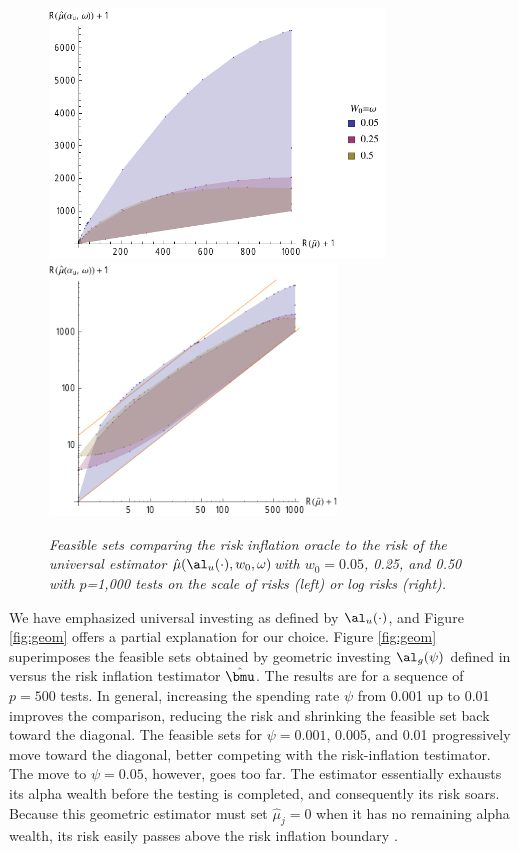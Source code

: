 \documentclass[12pt]{article}
\newcommand{\uTest}{\mbox{$\hat\mu(\al_u(\cdot),w_0,\omega)$}}
\begin{document}
\begin{figure}
 \caption{ \label{fig:univRI} {\sl Feasible sets comparing the risk inflation
 oracle to the risk of the universal estimator \uTest with $w_0=0.05$, 0.25, and
 0.50 with $p$=1,000 tests on the scale of risks (left) or log risks (right).}
  }

 \vspace{0.1in}
 \centerline{
 \includegraphics[width=3.5in]{figures/univVsRI}
 \includegraphics[width=3.0in]{figures/univVsRILog}    }
 \vspace{0.2in}
\end{figure}


 We have emphasized universal investing as defined by $\al_u(\cdot)$, and Figure
 \ref{fig:geom} offers a partial explanation for our choice.  Figure
 \ref{fig:geom} superimposes the feasible sets obtained by geometric investing
 $\al_g(\psi)$ defined in  versus the risk inflation testimator
 $\hat{\bmu}$.  The results are for a sequence of $p = 500$ tests.  In general,
 increasing the spending rate $\psi$ from 0.001 up to 0.01 improves the
 comparison, reducing the risk and shrinking the feasible set back toward the
 diagonal.  The feasible sets for $\psi=0.001$, 0.005, and 0.01 progressively
 move toward the diagonal, better competing with the risk-inflation testimator.
  The move to $\psi = 0.05$, however, goes too far.  The estimator essentially
 exhausts its alpha wealth before the testing is completed, and consequently its
 risk soars.  Because this geometric estimator must set $\hat\mu_j = 0$ when it
 has no remaining alpha wealth, its risk easily passes above the risk inflation
 boundary .
\end{document}
